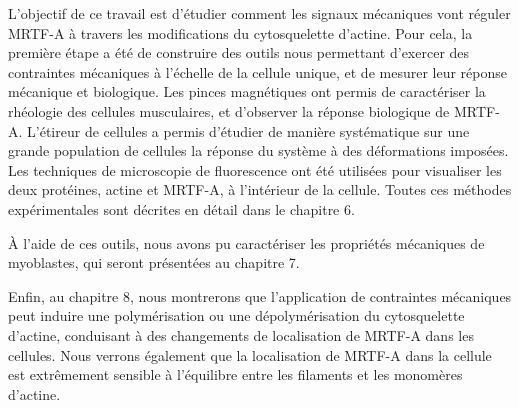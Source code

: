   L'objectif de ce travail est d'étudier comment les signaux mécaniques vont réguler MRTF-A à travers les modifications du cytosquelette d'actine. Pour cela, la première étape a été de construire des outils nous permettant d'exercer des contraintes mécaniques à l'échelle de la cellule unique, et de mesurer leur réponse mécanique et biologique. Les pinces magnétiques ont permis de caractériser la rhéologie des cellules musculaires, et d'observer la réponse biologique de MRTF-A. L'étireur de cellules a permis d'étudier de manière systématique sur une grande population de cellules la réponse du système à des déformations imposées. Les techniques de microscopie de fluorescence ont été utilisées pour visualiser les deux protéines, actine et MRTF-A, à l'intérieur de la cellule. Toutes ces méthodes expérimentales sont décrites en détail dans le chapitre 6. 
  
  À l'aide de ces outils, nous avons pu caractériser les propriétés mécaniques de myoblastes, qui seront présentées au chapitre 7. 
  
  Enfin, au chapitre 8, nous montrerons que l'application de contraintes mécaniques peut induire une polymérisation ou une dépolymérisation du cytosquelette d'actine, conduisant à des changements de localisation de MRTF-A dans les cellules. Nous verrons également que la localisation de MRTF-A dans la cellule est extrêmement sensible à l'équilibre entre les filaments et les monomères d'actine. 





%